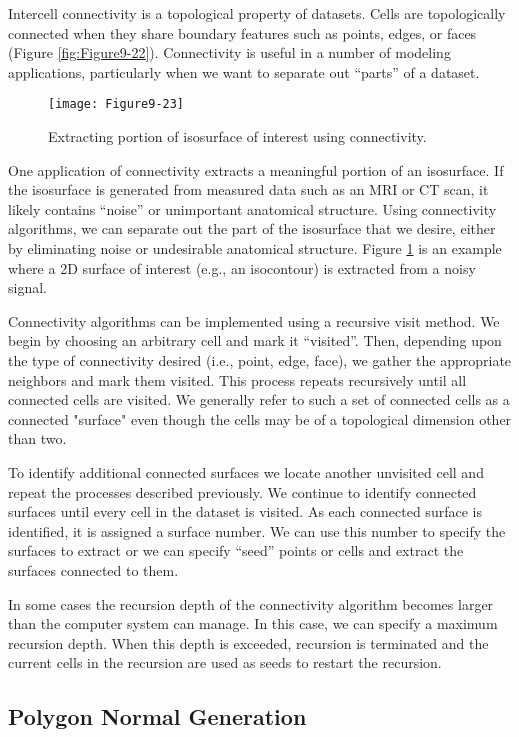 Intercell connectivity is a topological property of datasets. Cells are topologically connected when they share boundary features such as points, edges, or faces (Figure \ref{fig:Figure9-22}). Connectivity is useful in a number of modeling applications, particularly when we want to separate out ``parts'' of a dataset.


\begin{figure}[!htb]
	\centering
	\texttt{[image: Figure9-23]}
	\caption{Extracting portion of isosurface of interest using connectivity.}
	\label{fig:Figure9-23}
\end{figure}

One application of connectivity extracts a meaningful portion of an isosurface. If the isosurface is generated from measured data such as an MRI or CT scan, it likely contains ``noise'' or unimportant anatomical structure. Using connectivity algorithms, we can separate out the part of the isosurface that we desire, either by eliminating noise or undesirable anatomical structure. Figure \ref{fig:Figure9-23} is an example where a 2D surface of interest (e.g., an isocontour) is extracted from a noisy signal.

Connectivity algorithms can be implemented using a recursive visit method. We begin by choosing an arbitrary cell and mark it ``visited''. Then, depending upon the type of connectivity desired (i.e., point, edge, face), we gather the appropriate neighbors and mark them visited. This process repeats recursively until all connected cells are visited. We generally refer to such a set of connected cells as a connected "surface" even though the cells may be of a topological dimension other than two.

To identify additional connected surfaces we locate another unvisited cell and repeat the processes described previously. We continue to identify connected surfaces until every cell in the dataset is visited. As each connected surface is identified, it is assigned a surface number. We can use this number to specify the surfaces to extract or we can specify ``seed'' points or cells and extract the surfaces connected to them.

In some cases the recursion depth of the connectivity algorithm becomes larger than the computer system can manage. In this case, we can specify a maximum recursion depth. When this depth is exceeded, recursion is terminated and the current cells in the recursion are used as seeds to restart the recursion.

\subsection{Polygon Normal Generation}

